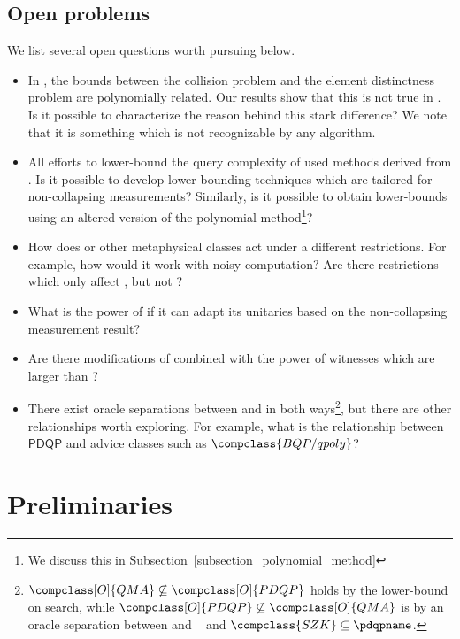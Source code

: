 \subsection{Open problems}\label{subsection_open_problems}

We list several open questions worth pursuing below.

\begin{itemize}
    \item In \bqpname, the bounds between the collision problem and the element distinctness problem are polynomially related. Our results show that this is not true in \pdqpname. Is it possible to characterize the reason behind this stark difference? We note that it is something which is not recognizable by any \bqpname algorithm.
    \item All efforts to lower-bound the query complexity of \pdqpname used methods derived from \bqpname. Is it possible to develop lower-bounding techniques which are tailored for non-collapsing measurements? Similarly, is it possible to obtain lower-bounds using an altered version of the polynomial method\footnote{We discuss this in Subsection~\ref{subsection_polynomial_method}}?
    \item How does \pdqpname or other metaphysical classes act under a different restrictions. For example, how would it work with noisy computation? Are there restrictions which only affect \bqpname, but not \pdqpname?
    \item What is the power of \pdqpname if it can adapt its unitaries based on the non-collapsing measurement result?
    \item Are there modifications of \bqpname combined with the power of witnesses which are larger than ?
    \item There exist oracle separations between \pdqpname and  in both ways\footnote{$\compclass[O]{QMA}\not \subseteq \compclass[O]{PDQP}$ holds by the lower-bound on search, while $\compclass[O]{PDQP}\not \subseteq \compclass[O]{QMA}$ is by an oracle separation between  and ~\cite{szk_qma_oracle_separation} and $\compclass{SZK}\subseteq \pdqpname$.}, but there are other relationships worth exploring. For example, what is the relationship between $\mathsf{PDQP}$ and advice classes such as $\compclass{BQP/qpoly}$?
\end{itemize}
 
\section{Preliminaries}

